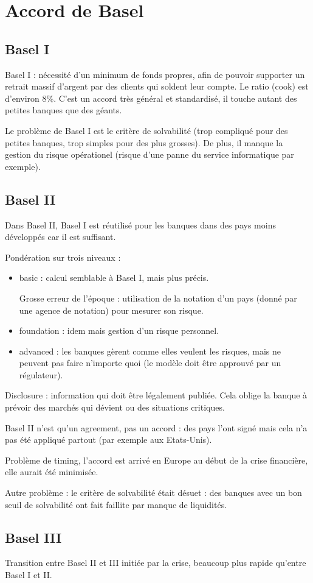 
\section{Accord de Basel}

\subsection{Basel I}
Basel I : nécessité d'un minimum de fonds propres, afin de pouvoir supporter un retrait massif d'argent par des clients qui soldent leur compte. Le ratio (cook) est d'environ 8\%. C'est un accord très général et standardisé, il touche autant des petites banques que des géants.

Le problème de Basel I est le critère de solvabilité (trop compliqué pour des petites banques, trop simples pour des plus grosses). De plus, il manque la gestion du risque opérationel (risque d'une panne du service informatique par exemple).

\subsection{Basel II}

Dans Basel II, Basel I est réutilisé pour les banques dans des pays moins développés car il est suffisant.

Pondération sur trois niveaux :

\begin{itemize}
	\item basic : calcul semblable à Basel I, mais plus précis.
	
	Grosse erreur de l'époque : utilisation de la notation d'un pays (donné par une agence de notation) pour mesurer son risque.
	
	\item foundation : idem mais gestion d'un risque personnel.
	\item advanced : les banques gèrent comme elles veulent les risques, mais ne peuvent pas faire n'importe quoi (le modèle doit être approuvé par un régulateur).
\end{itemize}

Disclosure : information qui doit être légalement publiée. Cela oblige la banque à prévoir des marchés qui dévient ou des situations critiques.

Basel II n'est qu'un agreement, pas un accord : des pays l'ont signé mais cela n'a pas été appliqué partout (par exemple aux Etats-Unis).

Problème de timing, l'accord est arrivé en Europe au début de la crise financière, elle aurait été minimisée.

Autre problème : le critère de solvabilité était désuet : des banques avec un bon seuil de solvabilité ont fait faillite par manque de liquidités.

\subsection{Basel III}

Transition entre Basel II et III initiée par la crise, beaucoup plus rapide qu'entre Basel I et II.

